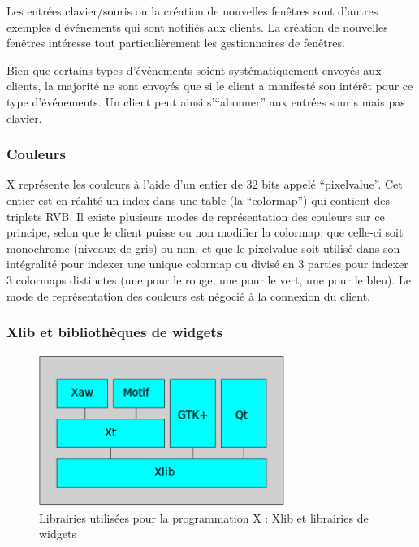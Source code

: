 Les entrées clavier/souris ou la création de nouvelles fenêtres sont d'autres exemples d'événements qui sont notifiés aux clients. La création de nouvelles fenêtres intéresse tout particulièrement les gestionnaires de fenêtres.

Bien que certains types d'événements soient systématiquement envoyés aux clients, la majorité ne sont envoyés que si le client a manifesté son intérêt pour ce type d'événements. Un client peut ainsi s'``abonner'' aux entrées souris mais pas clavier.

\subsubsection{Couleurs}
X représente les couleurs à l'aide d'un entier de 32 bits appelé ``pixelvalue''. Cet entier est en réalité un index dans une table (la ``colormap'') qui contient des triplets RVB. Il existe plusieurs modes de représentation des couleurs sur ce principe, selon que le client puisse ou non modifier la colormap, que celle-ci soit monochrome (niveaux de gris) ou non, et que le pixelvalue soit utilisé dans son intégralité pour indexer une unique colormap ou divisé en 3 parties pour indexer 3 colormaps distinctes (une pour le rouge, une pour le vert, une pour le bleu). Le mode de représentation des couleurs est négocié à la connexion du client.

\subsubsection{Xlib et bibliothèques de widgets}

\begin{figure}[H]
  \centering
    \includegraphics[width=8cm]{figures/x-libraries}
  \caption{Librairies utilisées pour la programmation X : Xlib et librairies de widgets}
  \label{fig:xlib}
\end{figure}

